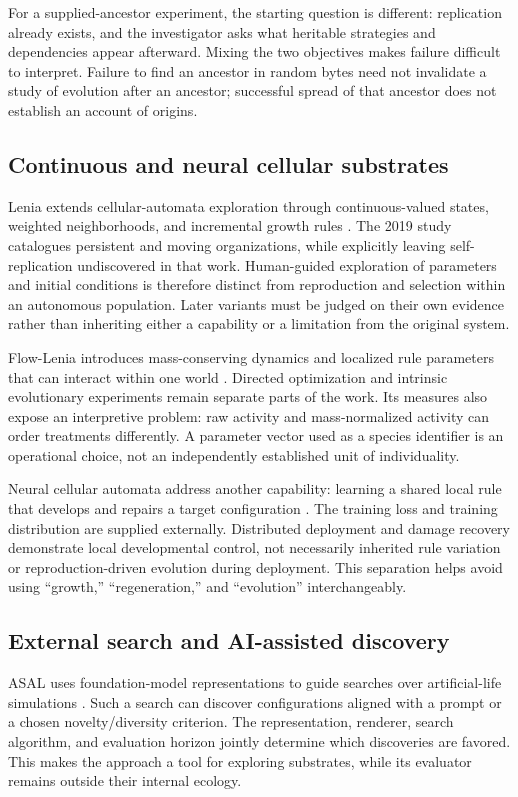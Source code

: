 For a supplied-ancestor experiment, the starting question is different:
replication already exists, and the investigator asks what heritable
strategies and dependencies appear afterward. Mixing the two objectives makes
failure difficult to interpret. Failure to find an ancestor in random bytes
need not invalidate a study of evolution after an ancestor; successful spread
of that ancestor does not establish an account of origins.

\subsection{Continuous and neural cellular substrates}
Lenia extends cellular-automata exploration through continuous-valued states,
weighted neighborhoods, and incremental growth rules \citep{Chan2019}. The
2019 study catalogues persistent and moving organizations, while explicitly
leaving self-replication undiscovered in that work. Human-guided exploration
of parameters and initial conditions is therefore distinct from reproduction
and selection within an autonomous population. Later variants must be judged
on their own evidence rather than inheriting either a capability or a
limitation from the original system.

Flow-Lenia introduces mass-conserving dynamics and localized rule parameters
that can interact within one world \citep{Plantec2025}. Directed optimization
and intrinsic evolutionary experiments remain separate parts of the work.
Its measures also expose an interpretive problem: raw activity and
mass-normalized activity can order treatments differently. A parameter vector
used as a species identifier is an operational choice, not an independently
established unit of individuality.

Neural cellular automata address another capability: learning a shared local
rule that develops and repairs a target configuration
\citep{Mordvintsev2020}. The training loss and training distribution are supplied
externally. Distributed deployment and damage recovery demonstrate local
developmental control, not necessarily inherited rule variation or
reproduction-driven evolution during deployment. This separation helps avoid
using ``growth,'' ``regeneration,'' and ``evolution'' interchangeably.

\subsection{External search and AI-assisted discovery}
ASAL uses foundation-model representations to guide searches over artificial-life
simulations \citep{Kumar2025}. Such a search can discover configurations aligned
with a prompt or a chosen novelty/diversity criterion. The representation,
renderer, search algorithm, and evaluation horizon jointly determine which
discoveries are favored. This makes the approach a tool for exploring
substrates, while its evaluator remains outside their internal ecology.

